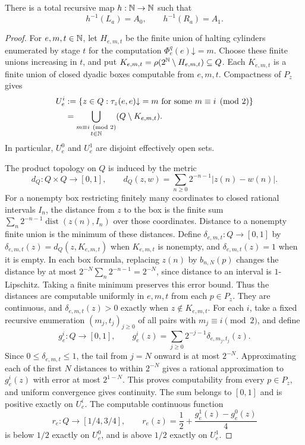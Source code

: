 \begin{lemma}\label{lem:miller-cut-reduction}
There is a total recursive map $h:\mathbb N\to\mathbb N$ such that
\[
 h^{-1}(L_a)=A_0,\qquad h^{-1}(R_a)=A_1.
\]
\end{lemma}
\begin{proof}
For $e,m,t\in\mathbb N$, let $H_{e,m,t}$ be the finite union of halting
cylinders enumerated by stage $t$ for the computation
$\Phi_e^q(e)\mathord\downarrow=m$. Choose these finite unions increasing
in $t$, and put $K_{e,m,t}=\rho(2^{\mathbb N}\setminus H_{e,m,t})\subseteq Q$.
Each $K_{e,m,t}$ is a finite union of closed dyadic boxes computable
from $e,m,t$. Compactness of $P_z$ gives
\begin{align*}
 U_e^i
 &:=\{z\in Q:\tau_z(e,e)\mathord\downarrow=m
                      \text{ for some }m\equiv i\pmod2\}\\
 &=\bigcup_{\substack{m\equiv i\pmod2\\t\in\mathbb N}}
       (Q\setminus K_{e,m,t}).
\end{align*}
In particular, $U_e^0$ and $U_e^1$ are disjoint effectively open sets.

The product topology on $Q$ is induced by the metric
\[
 d_Q:Q\times Q\to[0,1],\qquad
 d_Q(z,w)=\sum_{n\geq0}2^{-n-1}|z(n)-w(n)|.
\]
For a nonempty box restricting finitely many coordinates to closed
rational intervals $I_n$, the distance from $z$ to the box is the
finite sum
$\sum_n2^{-n-1}\operatorname{dist}(z(n),I_n)$ over those coordinates.
Distance to a nonempty finite union is the minimum of these distances.
Define $\delta_{e,m,t}:Q\to[0,1]$ by
$\delta_{e,m,t}(z)=d_Q(z,K_{e,m,t})$ when $K_{e,m,t}$ is nonempty, and
$\delta_{e,m,t}(z)=1$ when it is empty. In each box formula, replacing
$z(n)$ by $b_{n,N}(p)$ changes the distance by at most
$2^{-N}\sum_n2^{-n-1}=2^{-N}$, since distance to an interval is
$1$-Lipschitz. Taking a finite minimum preserves this error bound.
Thus the distances are computable uniformly in $e,m,t$ from each
$p\in P_z$. They are continuous, and $\delta_{e,m,t}(z)>0$ exactly
when $z\notin K_{e,m,t}$.
For each $i$, take a fixed recursive enumeration
$(m_j,t_j)_{j\geq0}$ of all pairs with $m_j\equiv i\pmod2$, and define
\[
 g_e^i:Q\to[0,1],\qquad
 g_e^i(z)=\sum_{j\geq0}2^{-j-1}\delta_{e,m_j,t_j}(z).
\]
Since $0\le\delta_{e,m,t}\le1$, the tail from $j=N$ onward is at most
$2^{-N}$. Approximating each of the first $N$ distances to within $2^{-N}$
gives a rational approximation to $g_e^i(z)$ with error at most
$2^{1-N}$. This proves computability from every $p\in P_z$, and uniform
convergence gives continuity. The sum belongs to $[0,1]$ and is positive
exactly on $U_e^i$. The computable continuous function
\[
 r_e:Q\to[1/4,3/4],\qquad
 r_e(z)=\frac12+\frac{g_e^1(z)-g_e^0(z)}4
\]
is below $1/2$ exactly on $U_e^0$, and
is above $1/2$ exactly on $U_e^1$.


\end{proof}
